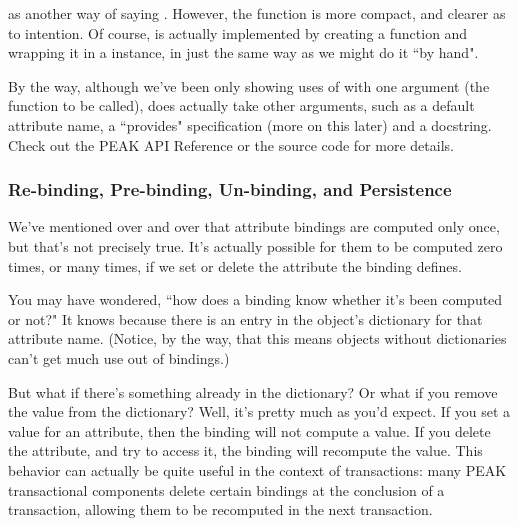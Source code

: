 \begin{verbatim%
}
\begin{verbatim%
}
\begin{verbatim%
}
\begin{verbatim%
}
\begin{verbatim%
}
\begin{verbatim%
}
\begin{verbatim%
}
\begin{verbatim%
}
\begin{verbatim%
}
as another way of saying .  However, the
 function is more compact, and clearer as to intention.
Of course,  is actually implemented by creating a
function and wrapping it in a  instance, in just the same
way as we might do it ``by hand".

By the way, although we've been only showing uses of  with
one argument (the function to be called),  does actually
take other arguments, such as a default attribute name, a ``provides"
specification (more on this later) and a docstring.  Check out the PEAK
API Reference or the source code for more details.






























\subsubsection{Re-binding, Pre-binding, Un-binding, and Persistence}

We've mentioned over and over that attribute bindings are computed only once,
but that's not precisely true.  It's actually possible for them to be computed
zero times, or many times, if we set or delete the attribute the binding
defines.

You may have wondered, ``how does a binding know whether it's been computed or
not?"  It knows because there is an entry in the object's dictionary for that
attribute name.  (Notice, by the way, that this means objects without
dictionaries can't get much use out of bindings.)

But what if there's something already in the dictionary?  Or what if you remove
the value from the dictionary?  Well, it's pretty much as you'd expect.  If you
set a value for an attribute, then the binding will not compute a value.  If
you delete the attribute, and try to access it, the binding will recompute the
value.  This behavior can actually be quite useful in the context of
transactions: many PEAK transactional components delete certain bindings at the
conclusion of a transaction, allowing them to be recomputed in the next
transaction.


\end{verbatim%
}
\end{verbatim%
}
\end{verbatim%
}
\end{verbatim%
}
\end{verbatim%
}
\end{verbatim%
}
\end{verbatim%
}
\end{verbatim%
}
\end{verbatim%
}
